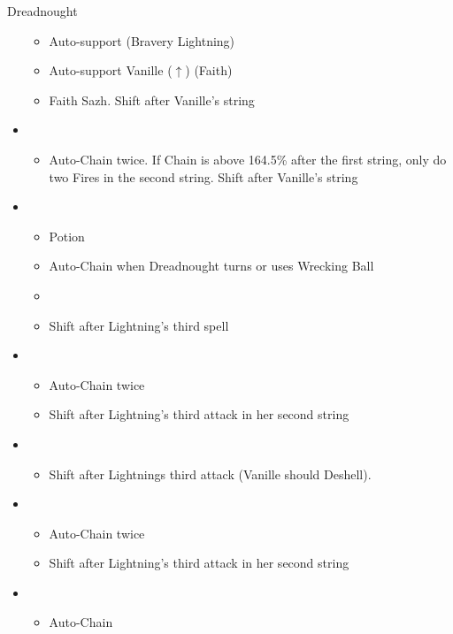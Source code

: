 \begin{battle}[2:16]{Dreadnought}
\begin{multicols}{2}
\begin{itemize}
			      \begin{itemize}
				      \item Auto-support (Bravery Lightning)
				      \item Auto-support Vanille ($\uparrow$) (Faith)
				      \item Faith Sazh. Shift after Vanille's string
			      \end{itemize}
			\item \fifth
			      \begin{itemize}
				      \item Auto-Chain twice. If Chain is above 164.5\% after the first string, only do two Fires in the second string. Shift after Vanille's string
			      \end{itemize}
			\item \fourth
			      \begin{itemize}
				      \item Potion
				      \item Auto-Chain when Dreadnought turns or uses Wrecking Ball
				      \item \stagger
				      \item Shift after Lightning's third spell
			      \end{itemize}
			\item \first
			      \begin{itemize}
				      \item Auto-Chain twice
				      \item Shift after Lightning's third attack in her second string
			      \end{itemize}
			\item \second
			      \begin{itemize}
				      \item Shift after Lightnings third attack (Vanille should Deshell).
			      \end{itemize}
			\item \first
			      \begin{itemize}
				      \item Auto-Chain twice
				      \item Shift after Lightning's third attack in her second string
			      \end{itemize}
			\item \third
			      \begin{itemize}
				      \item Auto-Chain
			      \end{itemize}
		\end{itemize}
	\end{multicols}
\end{battle}
